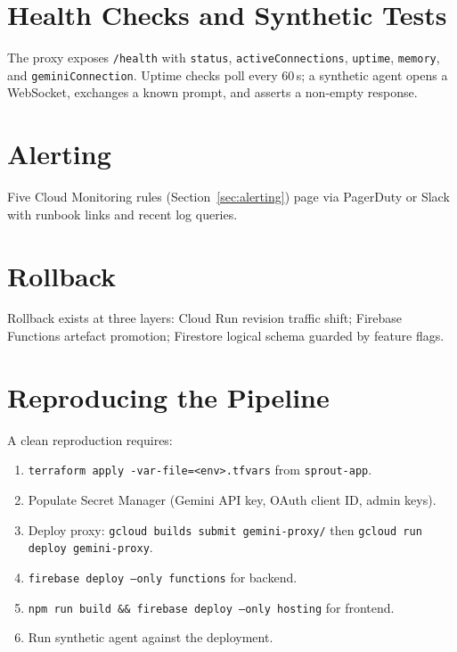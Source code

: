 \section{Health Checks and Synthetic Tests}
\label{sec:health-checks}

The proxy exposes \texttt{/health} with \texttt{status}, \texttt{activeConnections}, \texttt{uptime}, \texttt{memory}, and \texttt{geminiConnection}. Uptime checks poll every 60\,s; a synthetic agent opens a WebSocket, exchanges a known prompt, and asserts a non-empty response.

\section{Alerting}
\label{sec:ops-alerting}

Five Cloud Monitoring rules (Section~\ref{sec:alerting}) page via PagerDuty or Slack with runbook links and recent log queries.

\section{Rollback}
\label{sec:rollback}

Rollback exists at three layers: Cloud Run revision traffic shift; Firebase Functions artefact promotion; Firestore logical schema guarded by feature flags.

\section{Reproducing the Pipeline}
\label{sec:reproduce}

A clean reproduction requires:
\begin{enumerate}
    \item \texttt{terraform apply -var-file=<env>.tfvars} from \texttt{sprout-app}.
    \item Populate Secret Manager (Gemini API key, OAuth client ID, admin keys).
    \item Deploy proxy: \texttt{gcloud builds submit gemini-proxy/} then \texttt{gcloud run deploy gemini-proxy}.
    \item \texttt{firebase deploy --only functions} for backend.
    \item \texttt{npm run build \&\& firebase deploy --only hosting} for frontend.
    \item Run synthetic agent against the deployment.
\end{enumerate}

